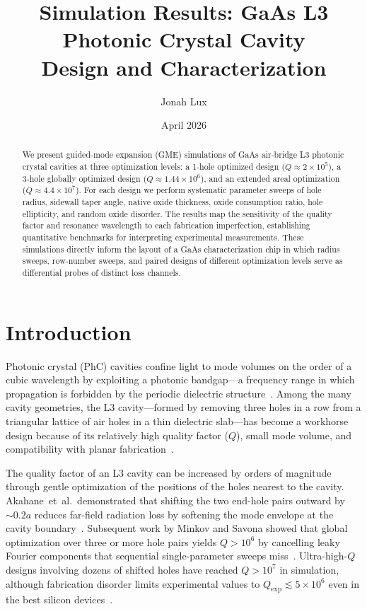 \documentclass[11pt,a4paper]{article}
\title{Simulation Results: GaAs L3 Photonic Crystal Cavity\\Design and Characterization}
\author{Jonah Lux}
\date{April 2026}
\begin{document}
\maketitle

\begin{abstract}
We present guided-mode expansion (GME) simulations of GaAs air-bridge L3 photonic crystal cavities at three optimization levels: a 1-hole optimized design ($Q \approx 2 \times 10^5$), a 3-hole globally optimized design ($Q \approx 1.44 \times 10^6$), and an extended areal optimization ($Q \approx 4.4 \times 10^7$). For each design we perform systematic parameter sweeps of hole radius, sidewall taper angle, native oxide thickness, oxide consumption ratio, hole ellipticity, and random oxide disorder. The results map the sensitivity of the quality factor and resonance wavelength to each fabrication imperfection, establishing quantitative benchmarks for interpreting experimental measurements. These simulations directly inform the layout of a GaAs characterization chip in which radius sweeps, row-number sweeps, and paired designs of different optimization levels serve as differential probes of distinct loss channels.
\end{abstract}

\section{Introduction}
\label{sec:introduction}

Photonic crystal (PhC) cavities confine light to mode volumes on the order of a cubic wavelength by exploiting a photonic bandgap---a frequency range in which propagation is forbidden by the periodic dielectric structure~\cite{joannopoulos2008}. Among the many cavity geometries, the L3 cavity---formed by removing three holes in a row from a triangular lattice of air holes in a thin dielectric slab---has become a workhorse design because of its relatively high quality factor ($Q$), small mode volume, and compatibility with planar fabrication~\cite{akahane2003}.

The quality factor of an L3 cavity can be increased by orders of magnitude through gentle optimization of the positions of the holes nearest to the cavity. Akahane~et~al.\ demonstrated that shifting the two end-hole pairs outward by $\sim 0.2a$ reduces far-field radiation loss by softening the mode envelope at the cavity boundary~\cite{akahane2003}. Subsequent work by Minkov and Savona showed that global optimization over three or more hole pairs yields $Q > 10^6$ by cancelling leaky Fourier components that sequential single-parameter sweeps miss~\cite{minkov2014}. Ultra-high-$Q$ designs involving dozens of shifted holes have reached $Q > 10^7$ in simulation, although fabrication disorder limits experimental values to $Q_\mathrm{exp} \lesssim 5 \times 10^6$ even in the best silicon devices~\cite{asano2021,vasco2020}.
\end{document}
